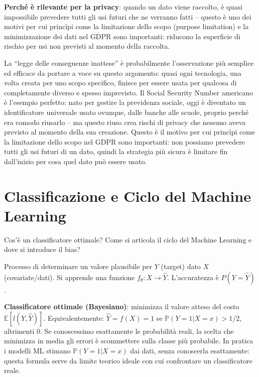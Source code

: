 \documentclass[a4paper,11pt]{article}
\begin{document}
\textbf{Perch\'{e} \`{e} rilevante per la privacy}: quando un dato viene raccolto, \`{e} quasi impossibile prevedere tutti gli usi futuri che ne verranno fatti -- questo \`{e} uno dei motivi per cui princìpi come la limitazione dello scopo (purpose limitation) e la minimizzazione dei dati nel GDPR sono importanti: riducono la superficie di rischio per usi non previsti al momento della raccolta.

\begin{nota}
La ``legge delle conseguenze inattese'' \`{e} probabilmente l'osservazione pi\`{u} semplice ed efficace da portare a voce su questo argomento: quasi ogni tecnologia, una volta creata per uno scopo specifico, finisce per essere usata per qualcosa di completamente diverso e spesso imprevisto. Il Social Security Number americano \`{e} l'esempio perfetto: nato per gestire la previdenza sociale, oggi \`{e} diventato un identificatore universale usato ovunque, dalle banche alle scuole, proprio perch\'{e} era comodo riusarlo -- ma questo riuso crea rischi di privacy che nessuno aveva previsto al momento della sua creazione. Questo \`{e} il motivo per cui princìpi come la limitazione dello scopo nel GDPR sono importanti: non possiamo prevedere tutti gli usi futuri di un dato, quindi la strategia pi\`{u} sicura \`{e} limitare fin dall'inizio per cosa quel dato pu\`{o} essere usato.
\end{nota}

\section{Classificazione e Ciclo del Machine Learning}

\begin{domanda}
Cos'\`{e} un classificatore ottimale? Come si articola il ciclo del Machine Learning e dove si introduce il bias?
\end{domanda}

\begin{definizione}[Classificazione]
Processo di determinare un valore plausibile per $Y$ (target) dato $X$ (covariate/dati). Si apprende una funzione $f_\theta: X \to \hat{Y}$. L'accuratezza \`{e} $P(Y = \hat{Y})$.
\end{definizione}

\textbf{Classificatore ottimale (Bayesiano)}: minimizza il valore atteso del costo $\mathbb{E}[l(Y, \hat{Y})]$. Equivalentemente: $\hat{Y} = f(X) = 1$ se $\mathbb{P}(Y=1|X=x) > 1/2$, altrimenti $0$. Se conoscessimo esattamente le probabilit\`{a} reali, la scelta che minimizza in media gli errori \`{e} scommettere sulla classe pi\`{u} probabile. In pratica i modelli ML stimano $\mathbb{P}(Y=1|X=x)$ dai dati, senza conoscerla esattamente: questa formula serve da limite teorico ideale con cui confrontare un classificatore reale.
\end{document}
